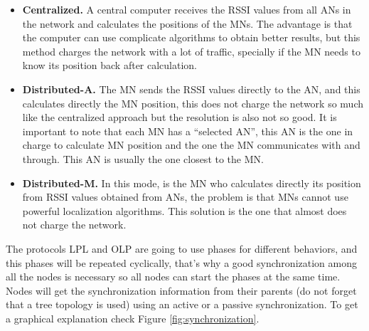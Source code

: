 \begin{itemize}
 \item \textbf{Centralized.} A central computer receives the \ac{RSSI} values from all \acp{AN} in the network and calculates the positions of 
the \acp{MN}. The advantage is that the computer can use complicate algorithms to obtain better results, but this method 
charges the network with a lot of traffic, specially if the \ac{MN} needs to know its position back after calculation.
 \item \textbf{Distributed-A.} The \ac{MN} sends the \ac{RSSI} values directly to the \ac{AN}, and this calculates directly the \ac{MN} position,
this does not charge the network so much like the centralized approach but the resolution is also not so good. It is important to note that 
each \ac{MN} has a ``selected \ac{AN}'', this \ac{AN} is the one in charge to calculate \ac{MN} position and the one the \ac{MN} communicates
with and through. This \ac{AN} is usually the one closest to the \ac{MN}.
 \item \textbf{Distributed-M.} In this mode, is the \ac{MN} who calculates directly its position from \ac{RSSI} values obtained from \acp{AN},
the problem is that \acp{MN} cannot use powerful localization algorithms. This solution is the one that almost does not charge the network.
\end{itemize}

The protocols \ac{LPL} and \ac{OLP} are going to use phases for different behaviors, and this phases will be repeated cyclically, that's why 
a good synchronization among all the nodes is necessary so all nodes can start the phases at the same time. Nodes will get 
the synchronization information from their parents (do not forget that a tree topology is used) using an active or a passive synchronization. 
To get a graphical explanation check Figure \ref{fig:synchronization}.

